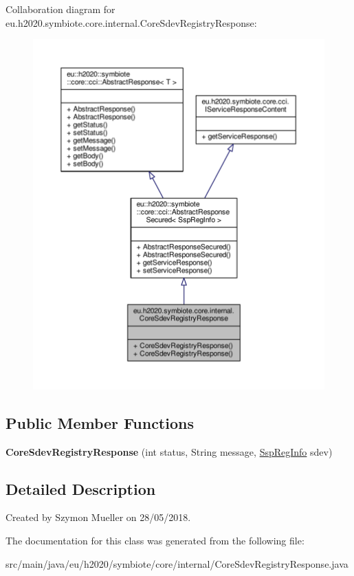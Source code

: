 Collaboration diagram for eu.\+h2020.\+symbiote.\+core.\+internal.\+Core\+Sdev\+Registry\+Response\+:\nopagebreak
\begin{figure}[H]
\begin{center}
\leavevmode
\includegraphics[width=350pt]{classeu_1_1h2020_1_1symbiote_1_1core_1_1internal_1_1CoreSdevRegistryResponse__coll__graph}
\end{center}
\end{figure}
\subsection*{Public Member Functions}
\begin{DoxyCompactItemize}
\item 
\mbox{\label{classeu_1_1h2020_1_1symbiote_1_1core_1_1internal_1_1CoreSdevRegistryResponse_af9585d5992cddc3172c28d8a9ed83089}} 
{\bfseries Core\+Sdev\+Registry\+Response} (int status, String message, \hyperlink{classeu_1_1h2020_1_1symbiote_1_1cloud_1_1model_1_1ssp_1_1SspRegInfo}{Ssp\+Reg\+Info} sdev)
\end{DoxyCompactItemize}


\subsection{Detailed Description}
Created by Szymon Mueller on 28/05/2018. 

The documentation for this class was generated from the following file\+:\begin{DoxyCompactItemize}
\item 
src/main/java/eu/h2020/symbiote/core/internal/Core\+Sdev\+Registry\+Response.\+java\end{DoxyCompactItemize}
